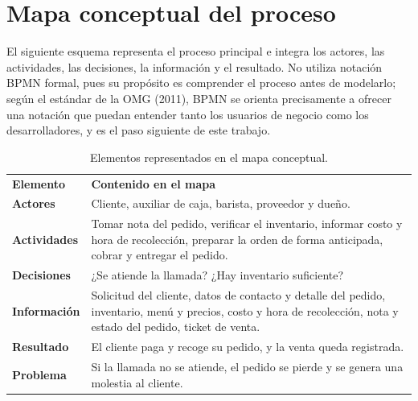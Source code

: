 \documentclass[12pt,letterpaper]{article}
\newcommand{\thd}[1]{\sffamily\bfseries #1}
\newcommand{\cab}{\rowcolor{black!18}}
\begin{document}
\clearpage
\section{Mapa conceptual del proceso}

El siguiente esquema representa el proceso principal e integra los actores, las actividades, las decisiones, la información y el resultado. No utiliza notación BPMN formal, pues su propósito es comprender el proceso antes de modelarlo; según el estándar de la OMG (2011), BPMN se orienta precisamente a ofrecer una notación que puedan entender tanto los usuarios de negocio como los desarrolladores, y es el paso siguiente de este trabajo.

\begin{table}[H]
\centering
\small
\begin{tabularx}{\textwidth}{>{\bfseries}p{3cm}Y}
\cab \thd{Elemento} & \thd{Contenido en el mapa}\\
Actores & Cliente, auxiliar de caja, barista, proveedor y dueño.\\
Actividades & Tomar nota del pedido, verificar el inventario, informar costo y hora de recolección, preparar la orden de forma anticipada, cobrar y entregar el pedido.\\
Decisiones & ¿Se atiende la llamada? ¿Hay inventario suficiente?\\
Información & Solicitud del cliente, datos de contacto y detalle del pedido, inventario, menú y precios, costo y hora de recolección, nota y estado del pedido, ticket de venta.\\
Resultado & El cliente paga y recoge su pedido, y la venta queda registrada.\\
Problema & Si la llamada no se atiende, el pedido se pierde y se genera una molestia al cliente.\\
\end{tabularx}
\caption{Elementos representados en el mapa conceptual.}
\end{table}
\end{document}
